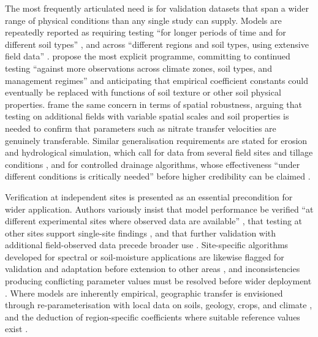 \documentclass[11pt]{article}
\begin{document}
The most frequently articulated need is for validation datasets that span a wider range of physical conditions than any single study can supply. Models are repeatedly reported as requiring testing ``for longer periods of time and for different soil types'' \parencite{Salazar2009}, and across ``different regions and soil types, using extensive field data'' \parencite{Li2026}. \textcite{Li2006} propose the most explicit programme, committing to continued testing ``against more observations across climate zones, soil types, and management regimes'' and anticipating that empirical coefficient constants could eventually be replaced with functions of soil texture or other soil physical properties. \textcite{Chelil2022} frame the same concern in terms of spatial robustness, arguing that testing on additional fields with variable spatial scales and soil properties is needed to confirm that parameters such as nitrate transfer velocities are genuinely transferable. Similar generalisation requirements are stated for erosion and hydrological simulation, which call for data from several field sites and tillage conditions \parencite{Turunen2020}, and for controlled drainage algorithms, whose effectiveness ``under different conditions is critically needed'' before higher credibility can be claimed \parencite{Negm2017}.

Verification at independent sites is presented as an essential precondition for wider application. Authors variously insist that model performance be verified ``at different experimental sites where observed data are available'' \parencite{Azevedo1997}, that testing at other sites support single-site findings \parencite{Qi2015}, and that further validation with additional field-observed data precede broader use \parencite{Kalita1998,Sadhukhan2019b}. Site-specific algorithms developed for spectral or soil-moisture applications are likewise flagged for validation and adaptation before extension to other areas \parencite{Rijal2013}, and inconsistencies producing conflicting parameter values must be resolved before wider deployment \parencite{Dar2022}. Where models are inherently empirical, geographic transfer is envisioned through re-parameterisation with local data on soils, geology, crops, and climate \parencite{Azevedo1997}, and the deduction of region-specific coefficients where suitable reference values exist \parencite{FathAllah2025}.
\end{document}
